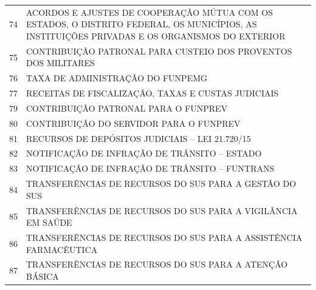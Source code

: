 \documentclass{article}
\begin{document}
\begin{longtable}[c]{m{1cm}|m{11cm}}
\multicolumn{1}{c|}{ 74 } & ACORDOS E AJUSTES DE COOPERAÇÃO MÚTUA COM OS ESTADOS, O DISTRITO FEDERAL, OS MUNICÍPIOS, AS INSTITUIÇÕES PRIVADAS E OS ORGANISMOS DO EXTERIOR \\
\multicolumn{1}{c|}{ 75 } & CONTRIBUIÇÃO PATRONAL PARA CUSTEIO DOS PROVENTOS DOS MILITARES \\
\multicolumn{1}{c|}{ 76 } & TAXA DE ADMINISTRAÇÃO DO FUNPEMG \\
\multicolumn{1}{c|}{ 77 } & RECEITAS DE FISCALIZAÇÃO, TAXAS E CUSTAS JUDICIAIS \\
\multicolumn{1}{c|}{ 79 } & CONTRIBUIÇÃO PATRONAL PARA O FUNPREV \\
\multicolumn{1}{c|}{ 80 } & CONTRIBUIÇÃO DO SERVIDOR PARA O FUNPREV  \\
\multicolumn{1}{c|}{ 81 } & RECURSOS DE DEPÓSITOS JUDICIAIS – LEI 21.720/15 \\
\multicolumn{1}{c|}{ 82 } & NOTIFICAÇÃO DE INFRAÇÃO DE TRÂNSITO – ESTADO \\
\multicolumn{1}{c|}{ 83 } & NOTIFICAÇÃO DE INFRAÇÃO DE TRÂNSITO – FUNTRANS \\
\multicolumn{1}{c|}{ 84 } & TRANSFERÊNCIAS DE RECURSOS DO SUS PARA A GESTÃO DO SUS \\
\multicolumn{1}{c|}{ 85 } & TRANSFERÊNCIAS DE RECURSOS DO SUS PARA A VIGILÂNCIA EM SAÚDE \\
\multicolumn{1}{c|}{ 86 } & TRANSFERÊNCIAS DE RECURSOS DO SUS PARA A ASSISTÊNCIA FARMACÊUTICA \\
\multicolumn{1}{c|}{ 87 } & TRANSFERÊNCIAS DE RECURSOS DO SUS PARA A ATENÇÃO BÁSICA \\

\end{longtable}
\end{document}
